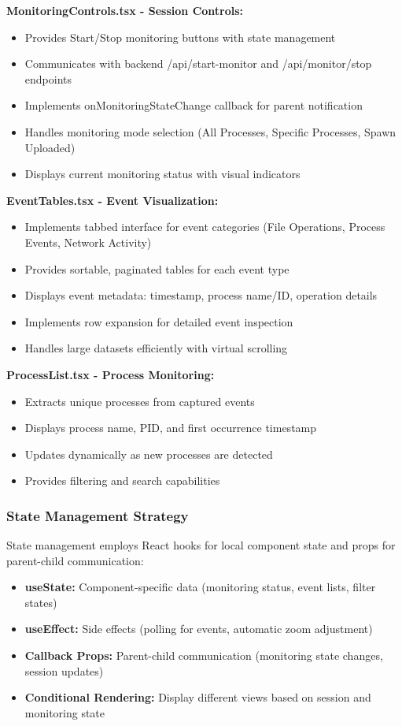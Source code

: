 \textbf{MonitoringControls.tsx - Session Controls:}
\begin{itemize}
    \item Provides Start/Stop monitoring buttons with state management
    \item Communicates with backend /api/start-monitor and /api/monitor/stop endpoints
    \item Implements onMonitoringStateChange callback for parent notification
    \item Handles monitoring mode selection (All Processes, Specific Processes, Spawn Uploaded)
    \item Displays current monitoring status with visual indicators
\end{itemize}

\textbf{EventTables.tsx - Event Visualization:}
\begin{itemize}
    \item Implements tabbed interface for event categories (File Operations, Process Events, Network Activity)
    \item Provides sortable, paginated tables for each event type
    \item Displays event metadata: timestamp, process name/ID, operation details
    \item Implements row expansion for detailed event inspection
    \item Handles large datasets efficiently with virtual scrolling
\end{itemize}

\textbf{ProcessList.tsx - Process Monitoring:}
\begin{itemize}
    \item Extracts unique processes from captured events
    \item Displays process name, PID, and first occurrence timestamp
    \item Updates dynamically as new processes are detected
    \item Provides filtering and search capabilities
\end{itemize}

\subsubsection{State Management Strategy}

State management employs React hooks for local component state and props for parent-child communication:

\begin{itemize}
    \item \textbf{useState:} Component-specific data (monitoring status, event lists, filter states)
    \item \textbf{useEffect:} Side effects (polling for events, automatic zoom adjustment)
    \item \textbf{Callback Props:} Parent-child communication (monitoring state changes, session updates)
    \item \textbf{Conditional Rendering:} Display different views based on session and monitoring state
\end{itemize}

